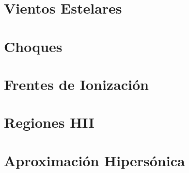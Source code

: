 \section{Vientos Estelares}
\section{Choques}
\section{Frentes de Ionizaci\'on}
\section{Regiones HII}
\section{Aproximación Hipers\'onica}
\label{sec:hipersonica}
